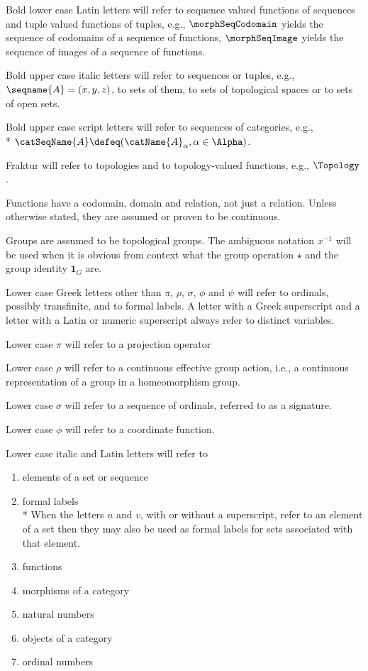 \documentclass{article}
\begin{document}
Bold lower case Latin letters will refer to sequence valued functions of
sequences and tuple valued functions of tuples, e.g., $\morphSeqCodomain$ yields
the sequence of codomains of a sequence of functions, $\morphSeqImage$ yields
the sequence of images of a sequence of functions.

Bold upper case italic letters will refer to sequences or tuples, e.g.,
$\seqname{A}=(x,y,z)$, to sets of them, to sets of topological spaces or
to sets of open sets.

Bold upper case script letters will refer to
sequences of categories, e.g., \\*
\nobreaks
  {{
    $\catSeqName{A} \defeq (\catName{A}_\alpha, \alpha \in \Alpha)$.
  }}

Fraktur will refer to topologies and to topology-valued functions, e.g.,
$\Topology$.

Functions have a codomain, domain and relation, not just a relation. Unless
otherwise stated, they are assumed or proven to be continuous.

Groups are assumed to be topological groups. The ambiguous notation
$x^{-1}$ will be used when it is obvious from context what the group
operation $\star$ and the group identity $\mathbf{1}_G$ are.

Lower case Greek letters other than $\pi$, $\rho$, $\sigma$, $\phi$ and
$\psi$ will refer to ordinals, possibly transfinite, and to formal
labels.  A letter with a Greek superscript and a letter with a Latin or
numeric superscript always refer to distinct variables.

Lower case $\pi$ will refer to a projection operator

Lower case $\rho$ will refer to a continuous effective group action,
i.e., a continuous representation of a group in a homeomorphism group.

Lower case $\sigma$ will refer to a sequence of ordinals, referred to as
a signature.

Lower case $\phi$ will refer to a coordinate function.

Lower case italic and Latin letters will refer to
\begin{enumerate}
\item elements of a set or sequence
\item formal labels \\*
When the letters $u$ and $v$, with or without a superscript, refer to an
element of a set then they may also be used as formal labels for sets
associated with that element.
\item functions
\item morphisms of a category
\item natural numbers
\item objects of a category
\item ordinal numbers
\end{enumerate}
\end{document}
